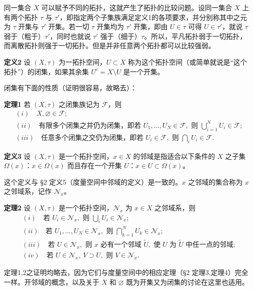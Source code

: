 同一集合 $X$ 可以赋予不同的拓扑，这就产生了拓扑的比较问题。设同一集合 $X$ 上有两个拓扑 $\tau$ 与 $\tau'$，即指定两个子集族满足定义1的各项要求，并分别称其中之元为 $\tau$ 开集与 $\tau'$ 开集。若一切 $\tau$ 开集均为 $\tau'$ 开集，即由 $U\in\tau$ 可得 $U\in\tau'$，就说 $\tau$ 弱于（粗于）$\tau'$，同时也就说 $\tau'$ 强于（细于）$\tau$。所以，平凡拓扑弱于一切拓扑，而离散拓扑则强于一切拓扑。但是并非任意两个拓扑都可以比较强弱。

\noindent\textbf{定义2}\quad
设 $(X,\tau)$ 为一拓扑空间，$U\subset X$ 称为这个拓扑空间（或简单就说是“这个拓扑”）的闭集，如果其余集 $U^c=X\setminus U$ 是一个开集。

闭集有下面的性质（证明很容易，故略去）：

\noindent\textbf{定理1}\quad
若 $(X,\tau)$ 之闭集族记为 $\mathcal F$，则
\begin{align*}
 &(i)\quad X,\varnothing\in\mathcal F;\\
 &(ii)\quad \text{有限多个闭集之并仍为闭集，即若 }U_1,\ldots,U_N\in\mathcal F,
 \text{ 则 }\bigcup_{i=1}^N U_i\in\mathcal F;\\
 &(iii)\quad \text{任意多个闭集之交仍为闭集，即若 }U_i\in\mathcal F,
 \text{ 则 }\bigcap_i U_i\in\mathcal F.
\end{align*}

\noindent\textbf{定义3}\quad
设 $(X,\tau)$ 是一个拓扑空间，$x\in X$ 的邻域是指适合以下条件的 $X$ 之子集 $\Omega(x)$：$x\in\Omega(x)$ 而且存在一个开集 $U$：$x\in U\subset\Omega(x)$。

这个定义与 \S2 定义5（度量空间中邻域的定义）是一致的。$x$ 之邻域的集合称为 $x$ 之邻域系，记作 $\mathcal N_x$。

\noindent\textbf{定理2}\quad
设 $(X,\tau)$ 是一个拓扑空间，$\mathcal N_x$ 为 $x\in X$ 之邻域系，则
\begin{align*}
 &(i)\quad \text{若 }U_i\in\mathcal N_x,\text{ 则 }\bigcup_i U_i\in\mathcal N_x;\\
 &(ii)\quad \text{若 }U_1,\ldots,U_N\in\mathcal N_x,\text{ 则 }\bigcap_{k=1}^{N}U_k\in\mathcal N_x;\\
 &(iii)\quad \text{若 }U\in\mathcal N_x,\text{ 则 }x\text{ 必有一个邻域 }\widetilde U,\text{ 使 }U\text{ 为 }\widetilde U\text{ 中任一点的邻域};\\
 &(iv)\quad \text{若 }U\in\mathcal N_x,\ V\supset U,\text{ 则 }V\in\mathcal N_x.
\end{align*}

定理1,2之证明均略去，因为它们与度量空间中的相应定理（\S2 定理3,定理4）完全一样。开邻域的概念，以及关于 $X$ 和 $\varnothing$ 既为开集又为闭集的讨论在这里也适用。

